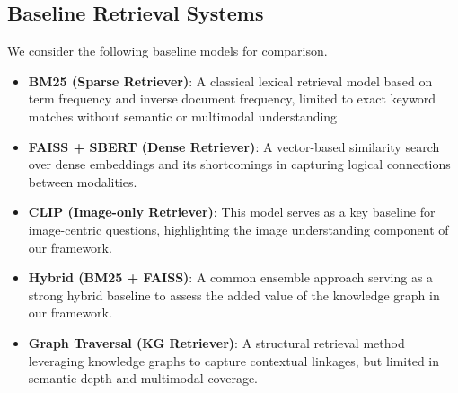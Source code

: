 \documentclass{svproc}
\begin{document}
\subsection{Baseline  Retrieval Systems}
We consider the following baseline models for comparison.
\begin{itemize}
\item \textbf{BM25 (Sparse Retriever)}: A classical lexical retrieval model based on term frequency and inverse document frequency, limited to exact keyword matches without semantic or multimodal understanding  
\item \textbf{FAISS + SBERT (Dense Retriever)}: A vector-based similarity search over dense embeddings and its shortcomings in capturing logical connections between modalities.  
\item \textbf{CLIP (Image-only Retriever)}: This model serves as a key baseline for image-centric questions, highlighting the image understanding component of our framework.
\item \textbf{Hybrid (BM25 + FAISS)}: A common ensemble approach serving as a strong hybrid baseline to assess the added value of the knowledge graph in our framework.
\item \textbf{Graph Traversal (KG Retriever)}: A structural retrieval method leveraging knowledge graphs to capture contextual linkages, but limited in semantic depth and multimodal coverage.
\end{itemize}
\end{document}
